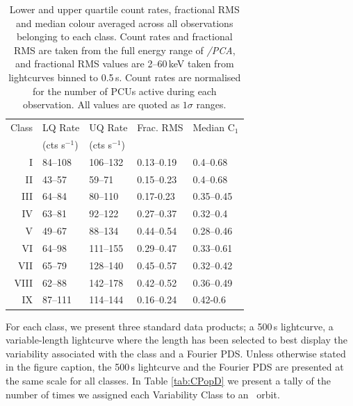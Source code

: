 \begin{table}
\centering
\begin{tabular}{rllll} %
\hline
\hline
\scriptsize Class &\scriptsize LQ Rate &\scriptsize  UQ Rate &\scriptsize Frac. RMS &\scriptsize Median C$_1$\\
\scriptsize &\scriptsize (cts s$^{-1}$) &\scriptsize (cts s$^{-1}$) & & \\
\hline
I&84--108&106--132&0.13--0.19&0.4--0.68\\
II&43--57&59--71&0.15--0.23&0.4--0.68\\
III&64--84&80--110&0.17-0.23&0.35--0.45\\
IV&63--81&92--122&0.27--0.37&0.32--0.4\\
V&49--67&88--134&0.44--0.54&0.28--0.46\\
VI&64--98&111--155&0.29--0.47&0.33--0.61\\
VII&65--79&128--140&0.45--0.57&0.32--0.42\\
VIII&62--88&142--178&0.42--0.52&0.36--0.49\\
IX&87--111&114--144&0.16--0.24&0.42-0.6\\
\hline
\hline
\end{tabular}
\caption{Lower and upper quartile count rates, fractional RMS and median colour averaged across all observations belonging to each class.  Count rates and fractional RMS are taken from the full energy range of \rxte\textit{/PCA}, and fractional RMS values are 2--60\,keV taken from lightcurves binned to 0.5\,s.  Count rates are normalised for the number of PCUs active during each observation.  All values are quoted as $1\sigma$ ranges.}
\label{tab:basicparams}
\end{table}

\par For each class, we present three standard data products; a 500\,s lightcurve, a variable-length lightcurve where the length has been selected to best display the variability associated with the class and a Fourier PDS.  Unless otherwise stated in the figure caption, the 500\,s lightcurve and the Fourier PDS are presented at the same scale for all classes.  In Table \ref{tab:CPopD} we present a tally of the number of times we assigned each Variability Class to an \rxte\ orbit.

